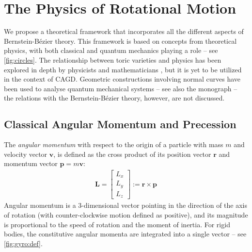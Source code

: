 \documentclass[final,3p,mathptmx]{elsarticle}
\begin{document}
\section{The Physics of Rotational Motion}\label{sec:rotational}
We propose a theoretical framework that incorporates all the different aspects of Bernstein-B\'{e}zier theory. This framework is based on concepts from theoretical physics, with both classical and quantum mechanics playing a role -- see \autoref{fig:circles}. The relationship between toric varieties and physics has been explored in depth by physicists and mathematicians \cite{atiyah1983angular,guillemin1994moment,da2003symplectic}, but it is yet to be utilized in the context of CAGD. Geometric constructions involving normal curves have been used to analyse quantum mechanical systems \cite{brody2001geometric,brody2012quantum} -- see also the monograph \cite{bengtsson2006geometry} -- the relations with the Bernstein-B\'{e}zier theory, however, are not discussed. 

\subsection{Classical Angular Momentum  and Precession}\label{sec:rotational:classical}
The \emph{angular momentum} with respect to the origin of a particle with mass $m$ and velocity vector $\mathbf{v}$, is defined as the cross product of its position vector $\mathbf{r}$ and momentum vector $\mathbf{p} = m\mathbf{v}$:
\begin{align}
\mathbf{L} = \begin{bmatrix}
L_{x} \\
L_{y} \\
L_{z}
\end{bmatrix} := \mathbf{r} \times \mathbf{p}
\end{align}
Angular momentum is a 3-dimensional vector pointing in the direction of the axis of rotation (with counter-clockwise motion defined as positive), and its magnitude is proportional to the speed of rotation and the moment of inertia. For rigid bodies,  the constitutive angular momenta are integrated into a single vector -- see \autoref{fig:gyro:def}.
\end{document}
